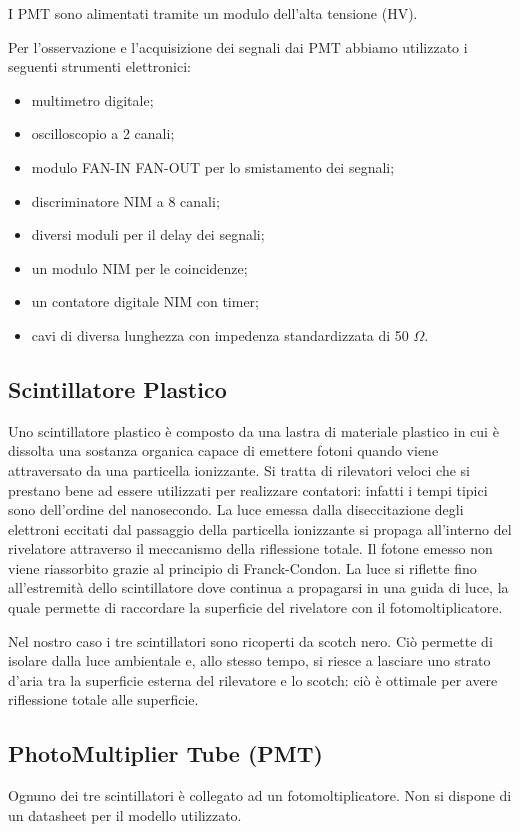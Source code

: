 \documentclass[a4paper,10pt]{article}
\begin{document}
I PMT sono alimentati tramite un modulo dell'alta tensione (HV). 

Per l'osservazione e l'acquisizione dei segnali dai PMT abbiamo utilizzato i seguenti strumenti elettronici:
\begin{itemize}
\item multimetro digitale;
\item oscilloscopio a 2 canali;
\item modulo FAN-IN FAN-OUT per lo smistamento dei segnali;
\item discriminatore NIM a 8 canali;
\item diversi moduli per il delay dei segnali;
\item un modulo NIM per le coincidenze;
\item un contatore digitale NIM con timer;
\item cavi di diversa lunghezza con impedenza standardizzata di 50 $\Omega$.
\end{itemize}


\label{sec:apparato} 

\subsection{Scintillatore Plastico}
Uno scintillatore plastico è composto da una lastra di materiale plastico in cui è dissolta una sostanza organica capace di emettere fotoni quando viene attraversato da una particella ionizzante. Si tratta di rilevatori veloci che si prestano bene ad essere utilizzati per realizzare contatori: infatti i tempi tipici sono dell'ordine del nanosecondo. La luce emessa dalla diseccitazione degli elettroni eccitati dal passaggio della particella ionizzante si propaga all'interno del rivelatore attraverso il meccanismo della riflessione totale. Il fotone emesso non viene riassorbito grazie al principio di Franck-Condon. La luce si riflette fino all'estremità dello scintillatore dove continua a propagarsi in una guida di luce, la quale permette di raccordare la superficie del rivelatore con il fotomoltiplicatore.

Nel nostro caso i tre scintillatori sono ricoperti da scotch nero. Ciò permette di isolare dalla luce ambientale e, allo stesso tempo, si riesce a lasciare uno strato d'aria tra la superficie esterna del rilevatore e lo scotch: ciò è ottimale per avere riflessione totale alle superficie.

\subsection{PhotoMultiplier Tube (PMT)}
Ognuno dei tre scintillatori è collegato ad un fotomoltiplicatore. Non si dispone di un datasheet per il modello utilizzato.
\end{document}
